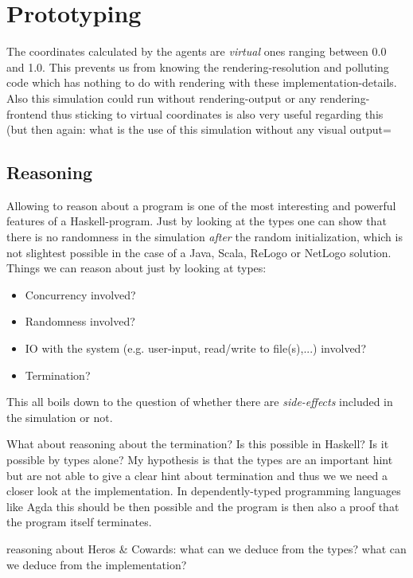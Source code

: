 \section{Prototyping}

\graphicspath{{./fig/}}	%

The coordinates calculated by the agents are \textit{virtual} ones ranging between 0.0 and 1.0. This prevents us from knowing the rendering-resolution and polluting code which has nothing to do with rendering with these implementation-details. Also this simulation could run without rendering-output or any rendering-frontend thus sticking to virtual coordinates is also very useful regarding this (but then again: what is the use of this simulation without any visual output=


\subsection{Reasoning}
Allowing to reason about a program is one of the most interesting and powerful features of a Haskell-program. Just by looking at the types one can show that there is no randomness in the simulation \textit{after} the random initialization, which is not slightest possible in the case of a Java, Scala, ReLogo or NetLogo solution. Things we can reason about just by looking at types:

\begin{itemize}
\item Concurrency involved?
\item Randomness involved?
\item IO with the system (e.g. user-input, read/write to file(s),...) involved?
\item Termination?
\end{itemize}

This all boils down to the question of whether there are \textit{side-effects} included in the simulation or not.

What about reasoning about the termination? Is this possible in Haskell? Is it possible by types alone? My hypothesis is that the types are an important hint but are not able to give a clear hint about termination and thus we we need a closer look at the implementation. In dependently-typed programming languages like Agda this should be then possible and the program is then also a 
proof that the program itself terminates.

reasoning about Heros \& Cowards: what can we deduce from the types? what can we deduce from the implementation?\\

